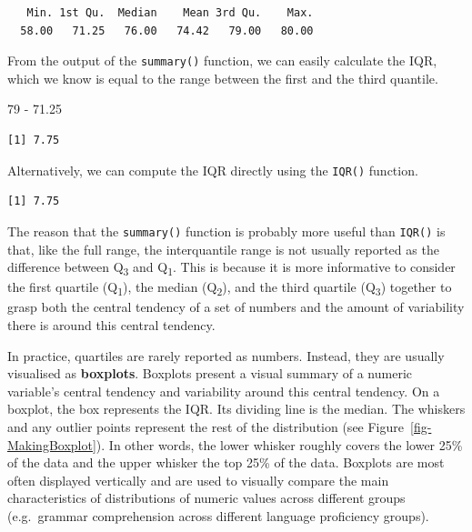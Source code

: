 \documentclass[
  letterpaper,
  DIV=11,
  numbers=noendperiod]{scrreprt}
\newenvironment{Shaded}{\begin{snugshade}}{\end{snugshade}}
\newcommand{\DecValTok}[1]{\textcolor[rgb]{0.68,0.00,0.00}{#1}}
\newcommand{\FloatTok}[1]{\textcolor[rgb]{0.68,0.00,0.00}{#1}}
\newcommand{\FunctionTok}[1]{\textcolor[rgb]{0.28,0.35,0.67}{#1}}
\newcommand{\NormalTok}[1]{\textcolor[rgb]{0.00,0.23,0.31}{#1}}
\newcommand{\SpecialCharTok}[1]{\textcolor[rgb]{0.37,0.37,0.37}{#1}}
\begin{document}
\begin{Shaded}
\end{Shaded}

\begin{verbatim}
   Min. 1st Qu.  Median    Mean 3rd Qu.    Max. 
  58.00   71.25   76.00   74.42   79.00   80.00 
\end{verbatim}

From the output of the \texttt{summary()} function, we can easily
calculate the IQR, which we know is equal to the range between the first
and the third quantile.

\begin{Shaded}
\begin{Highlighting}[]
\DecValTok{79} \SpecialCharTok{{-}} \FloatTok{71.25}
\end{Highlighting}
\end{Shaded}

\begin{verbatim}
[1] 7.75
\end{verbatim}

Alternatively, we can compute the IQR directly using the \texttt{IQR()}
function.

\begin{Shaded}
\end{Shaded}

\begin{verbatim}
[1] 7.75
\end{verbatim}

The reason that the \texttt{summary()} function is probably more useful
than \texttt{IQR()} is that, like the full range, the interquantile
range is not usually reported as the difference between
Q\textsubscript{3} and Q\textsubscript{1}. This is because it is more
informative to consider the first quartile (Q\textsubscript{1}), the
median (Q\textsubscript{2}), and the third quartile (Q\textsubscript{3})
together to grasp both the central tendency of a set of numbers and the
amount of variability there is around this central tendency.

In practice, quartiles are rarely reported as numbers. Instead, they are
usually visualised as \textbf{boxplots}. Boxplots present a visual
summary of a numeric variable's central tendency and variability around
this central tendency. On a boxplot, the box represents the IQR. Its
dividing line is the median. The whiskers and any outlier points
represent the rest of the distribution (see
Figure~\ref{fig-MakingBoxplot}). In other words, the lower whisker
roughly covers the lower 25\% of the data and the upper whisker the top
25\% of the data. Boxplots are most often displayed vertically and are
used to visually compare the main characteristics of distributions of
numeric values across different groups (e.g.~grammar comprehension
across different language proficiency groups).
\end{document}
